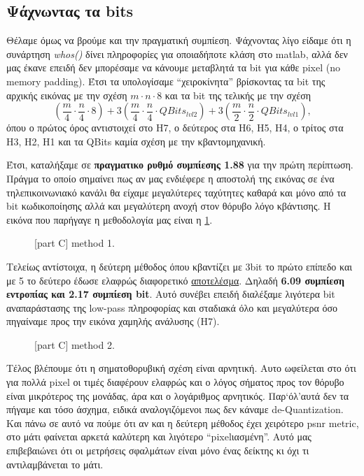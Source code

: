 \documentclass[11pt]{scrartcl} %
\begin{document}
\subsection{Ψάχνωντας τα bits}
Θέλαμε όμως να βρούμε και την πραγματική συμπίεση. Ψάχνοντας λίγο
είδαμε ότι η συνάρτηση \textit{whos()} δίνει πληροφορίες για οποιαδήποτε κλάση στο matlab, αλλά δεν μας έκανε επειδή δεν μπορέσαμε να κάνουμε μεταβλητά τα bit για κάθε pixel (no memory padding).
Έτσι τα υπολογίσαμε ``χειροκίνητα'' βρίσκοντας τα bit της αρχικής εικόνας με την σχέση $m\cdot n\cdot 8$ και τα bit της τελικής με την σχέση
$$(\frac{m}{4}\cdot \frac{n}{4}\cdot 8) + 3(\frac{m}{4}\cdot \frac{n}{4}\cdot QBits_{lvl2}) + 3(\frac{m}{2}\cdot \frac{n}{2}\cdot QBits_{lvl1}),$$
όπου ο πρώτος όρος αντιστοιχεί στο Η7, ο δεύτερος στα Η6, Η5, Η4, ο τρίτος στα Η3, Η2, Η1 και τα QBits καμία σχέση με την κβαντομηχανική.

Έτσι, καταλήξαμε σε \textbf{πραγματικο ρυθμό συμπίεσης 1.88} για την πρώτη περίπτωση. Πράγμα το οποίο σημαίνει πως αν μας ενδιέφερε η αποστολή της εικόνας σε ένα τηλεπικοινωνιακό κανάλι
θα είχαμε μεγαλύτερες ταχύτητες καθαρά και μόνο από τα bit κωδικοποίησης αλλά και μεγαλύτερη ανοχή στον θόρυβο λόγο κβάντισης. Η εικόνα που παρήγαγε η μεθοδολογία μας είναι η \ref{c2}.

\begin{figure}[h]
    \centering
    \caption{[part C] method 1.}
    \label{c2}
\end{figure}

Τελείως αντίστοιχα, η δεύτερη μέθοδος όπου κβαντίζει με 3bit το πρώτο επίπεδο και με 5 το δεύτερο έδωσε ελαφρώς διαφορετικό \hyperlink{apotel}{αποτελέσμα}. Δηλαδή
\textbf{6.09 συμπίεση εντροπίας και 2.17 συμπίεση bit}. Αυτό συνέβει επειδή διαλέξαμε λιγότερα bit αναπαράστασης της low-pass πληροφορίας και σταδιακά όλο και
μεγαλύτερα όσο πηγαίναμε προς την εικόνα χαμηλής ανάλυσης (Η7).

\hypertarget{apotel}{
\begin{figure}[h]
    \centering
    \caption{[part C] method 2.}
    \label{c3}
\end{figure}
}

Τέλος βλέπουμε ότι η σηματοθορυβική σχέση είναι αρνητική. Αυτο ωφείλεται στο ότι για πολλά pixel οι τιμές διαφέρουν ελαφρώς και ο λόγος σήματος προς τον θόρυβο είναι μικρότερος της μονάδας, άρα
και ο λογάριθμος αρνητικός. Παρ`όλ'αυτά δεν τα πήγαμε και τόσο άσχημα, ειδικά αναλογιζόμενοι πως δεν κάναμε de-Quantization. Και πάνω σε αυτό να πούμε ότι αν και η δεύτερη μέθοδος έχει χειρότερο
psnr metric, στο μάτι φαίνεται αρκετά καλύτερη και λιγότερο ``pixelιασμένη''. Αυτό μας επιβεβαιώνει ότι οι μετρήσεις σφαλμάτων είναι μόνο ένας δείκτης κι όχι τι αντιλαμβάνεται το μάτι.
\end{document}
